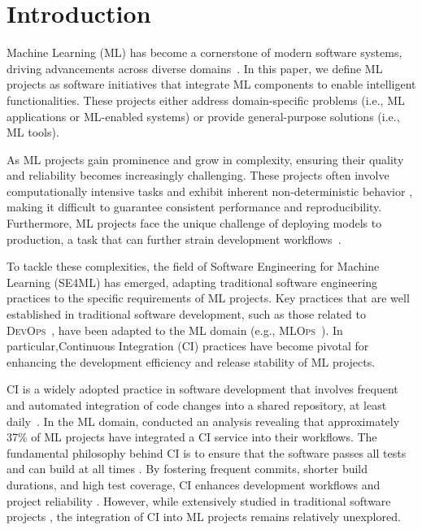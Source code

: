 \section{Introduction}
\label{intro}

Machine Learning (ML) has become a cornerstone of modern software systems, driving advancements across diverse domains~\citep{washizaki2019studying, gonzalez2020state, pallathadka2023impact}. 
In this paper, we define ML projects as software initiatives that integrate ML components to enable intelligent functionalities. These projects either address domain-specific problems (i.e., ML applications or ML-enabled systems) or provide general-purpose solutions (i.e., ML tools).

As ML projects gain prominence and grow in complexity, ensuring their quality and reliability becomes increasingly challenging. 
These projects often involve computationally intensive tasks and exhibit inherent non-deterministic behavior \citep{nascimento2020software, giray2021software}, making it difficult to guarantee consistent performance and reproducibility.
Furthermore, ML projects face the unique challenge of deploying models to production, a task that can further strain development workflows~\citep{symeonidis2022mlops}.

To tackle these complexities, the field of Software Engineering for Machine Learning (\textsc{SE4ML}) has emerged, adapting traditional software engineering practices to the specific requirements of ML projects.
Key practices that are well established in traditional software development, such as those related to \textsc{DevOps}~\citep{leite2019survey}, have been adapted to the ML domain (e.g., \textsc{MLOps}~\citep{makinen2021needs}).
In particular,Continuous Integration (CI) practices have become pivotal for enhancing the development efficiency and release stability of ML projects\citep{gift2021practical}.

CI is a widely adopted practice in software development that involves frequent and automated integration of code changes into a shared repository, at least daily~\citep{fowler-ci-2006, duvall2007continuous}. 
In the ML domain, \cite{rzig2022characterizing} conducted an analysis revealing that approximately 37\% of ML projects have integrated a CI service into their workflows. The fundamental philosophy behind CI is to ensure that the software passes all tests and can build at all times \citep{duvall2007continuous}.
By fostering frequent commits, shorter build durations, and high test coverage, CI enhances development workflows and project reliability \citep{soares2022effects}. However, while extensively studied in traditional software projects \citep{vasilescu2015quality, hilton2016usage, zhao2017impact, bernardo2018studying, nery2019empirical, santos2022investigating, saraiva2023unveiling}, the integration of CI into ML projects remains relatively unexplored.

